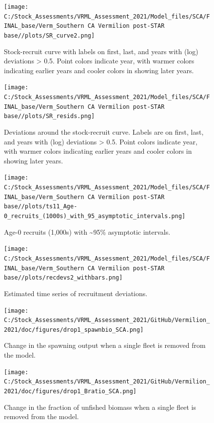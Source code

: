 \documentclass[11pt,
  english,
]{article}
\begin{document}
\begin{figure}
\centering
\texttt{[image: C:/Stock\_Assessments/VRML\_Assessment\_2021/Model\_files/SCA/FINAL\_base/Verm\_Southern CA Vermilion post-STAR base//plots/SR\_curve2.png]}
\caption{Stock-recruit curve with labels on first, last, and years with (log) deviations \textgreater{} 0.5. Point colors indicate year, with warmer colors indicating earlier years and cooler colors in showing later years.\label{fig:bh-curve}}
\end{figure}

\begin{figure}
\centering
\texttt{[image: C:/Stock\_Assessments/VRML\_Assessment\_2021/Model\_files/SCA/FINAL\_base/Verm\_Southern CA Vermilion post-STAR base//plots/SR\_resids.png]}
\caption{Deviations around the stock-recruit curve. Labels are on first, last, and years with (log) deviations \textgreater{} 0.5. Point colors indicate year, with warmer colors indicating earlier years and cooler colors in showing later years.\label{fig:bh-resids}}
\end{figure}

\FloatBarrier

\begin{figure}
\centering
\texttt{[image: C:/Stock\_Assessments/VRML\_Assessment\_2021/Model\_files/SCA/FINAL\_base/Verm\_Southern CA Vermilion post-STAR base//plots/ts11\_Age-0\_recruits\_(1000s)\_with\_95\_asymptotic\_intervals.png]}
\caption{Age-0 recruits (1,000s) with \textasciitilde95\% asymptotic intervals.\label{fig:recruits}}
\end{figure}

\begin{figure}
\centering
\texttt{[image: C:/Stock\_Assessments/VRML\_Assessment\_2021/Model\_files/SCA/FINAL\_base/Verm\_Southern CA Vermilion post-STAR base//plots/recdevs2\_withbars.png]}
\caption{Estimated time series of recruitment deviations.\label{fig:recdevs}}
\end{figure}

\FloatBarrier

\begin{figure}
\centering
\texttt{[image: C:/Stock\_Assessments/VRML\_Assessment\_2021/GitHub/Vermilion\_2021/doc/figures/drop1\_spawnbio\_SCA.png]}
\caption{Change in the spawning output when a single fleet is removed from the model.\label{fig:drop-spawnbio}}
\end{figure}

\begin{figure}
\centering
\texttt{[image: C:/Stock\_Assessments/VRML\_Assessment\_2021/GitHub/Vermilion\_2021/doc/figures/drop1\_Bratio\_SCA.png]}
\caption{Change in the fraction of unfished biomass when a single fleet is removed from the model.\label{fig:drop-bratio}}
\end{figure}
\end{document}
